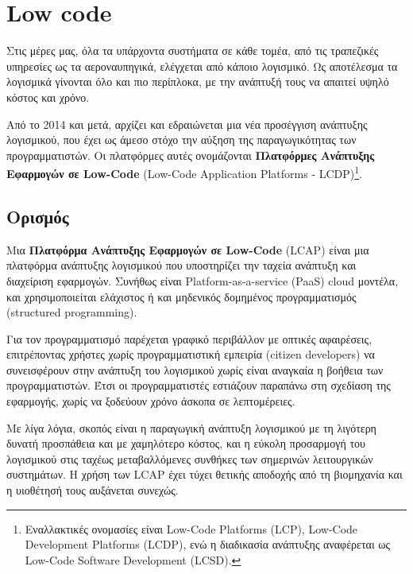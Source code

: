 \chapter{Low code}
    Στις μέρες μας, όλα τα υπάρχοντα συστήματα σε κάθε τομέα, από τις τραπεζικές υπηρεσίες ως τα αεροναυπηγικά, ελέγχεται από κάποιο λογισμικό.
    Ως αποτέλεσμα τα λογισμικά γίνονται όλο και πιο περίπλοκα, με την ανάπτυξή τους να απαιτεί υψηλό κόστος και χρόνο.

    Από το 2014 και μετά, αρχίζει και εδραιώνεται μια νέα προσέγγιση ανάπτυξης λογισμικού, που έχει ως άμεσο στόχο την αύξηση της παραγωγικότητας των προγραμματιστών.
    Οι πλατφόρμες αυτές ονομάζονται \textbf{Πλατφόρμες Ανάπτυξης Εφαρμογών σε Low-Code} (Low-Code Application Platforms - LCDP)\footnote{Εναλλακτικές ονομασίες είναι Low-Code Platforms (LCP), Low-Code Development Platforms (LCDP), ενώ η διαδικασία ανάπτυξης αναφέρεται ως Low-Code Software Development (LCSD).}. \cite{Bock2021}

    \section{Ορισμός}
        Μια \textbf{Πλατφόρμα Ανάπτυξης Εφαρμογών σε Low-Code} (LCAP) είναι μια πλατφόρμα ανάπτυξης λογισμικού που υποστηρίζει την ταχεία ανάπτυξη και διαχείριση εφαρμογών.
            Συνήθως είναι Platform-as-a-service (PaaS) cloud μοντέλα, και χρησιμοποιείται ελάχιστος ή και μηδενικός δομημένος προγραμματισμός (structured \linebreak programming).

        Για τον προγραμματισμό παρέχεται γραφικό περιβάλλον με οπτικές αφαιρέσεις, επιτρέποντας χρήστες χωρίς προγραμματιστική εμπειρία (citizen developers) να συνεισφέρουν στην ανάπτυξη του λογισμικού χωρίς είναι αναγκαία η βοήθεια των προγραμματιστών.
        Έτσι οι προγραμματιστές εστιάζουν παραπάνω στη σχεδίαση της εφαρμογής, χωρίς να ξοδεύουν χρόνο άσκοπα σε λεπτομέρειες.

        Με λίγα λόγια, σκοπός είναι η παραγωγική ανάπτυξη λογισμικού με τη λιγότερη δυνατή προσπάθεια και με χαμηλότερο κόστος, και η εύκολη προσαρμογή του λογισμικού στις ταχέως μεταβαλλόμενες συνθήκες των σημερινών λειτουργικών συστημάτων.
        Η χρήση των LCAP έχει τύχει θετικής αποδοχής από τη βιομηχανία και η υιοθέτησή τους αυξάνεται συνεχώς. \cite{Bock2021} \cite{Bucaioni2022} \cite{Sahay2020}

        \begin{displayquote} \justifying
             \cite{Ibm_2024}
        \end{displayquote}

